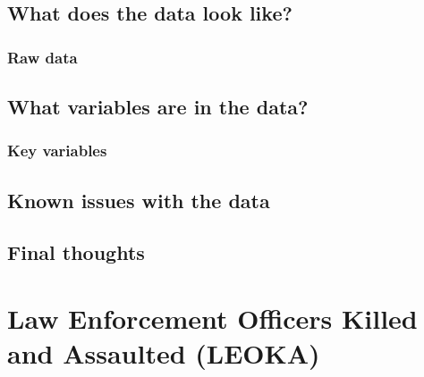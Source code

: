 \documentclass[
  12pt,
  openany]{book}
\begin{document}
\hypertarget{what-does-the-data-look-like}{%
\section{What does the data look like?}\label{what-does-the-data-look-like}}

\hypertarget{raw-data}{%
\subsection{Raw data}\label{raw-data}}

\hypertarget{what-variables-are-in-the-data}{%
\section{What variables are in the data?}\label{what-variables-are-in-the-data}}

\hypertarget{key-variables}{%
\subsection{Key variables}\label{key-variables}}

\hypertarget{known-issues-with-the-data}{%
\section{Known issues with the data}\label{known-issues-with-the-data}}

\hypertarget{final-thoughts}{%
\section{Final thoughts}\label{final-thoughts}}

\hypertarget{leoka}{%
\chapter{Law Enforcement Officers Killed and Assaulted (LEOKA)}\label{leoka}}
\end{document}
